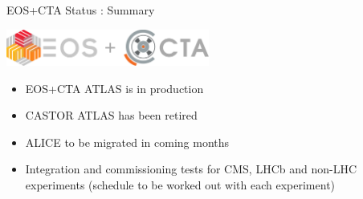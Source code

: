 \documentclass[aspectratio=1610]{beamer}
\begin{document}
\begin{frame}{EOS+CTA Status : Summary}{}
\begin{center}
\includegraphics[width=0.5\textwidth]{../Logo/Logo_EOS+CTA}
\end{center}
\begin{itemize}
    \item EOS+CTA ATLAS is in production
    \item CASTOR ATLAS has been retired
    \item ALICE to be migrated in coming months
    \item Integration and commissioning tests for CMS, LHCb and non-LHC experiments
       (schedule to be worked out with each experiment)
\end{itemize}
\end{frame}

\backcover
\end{document}
